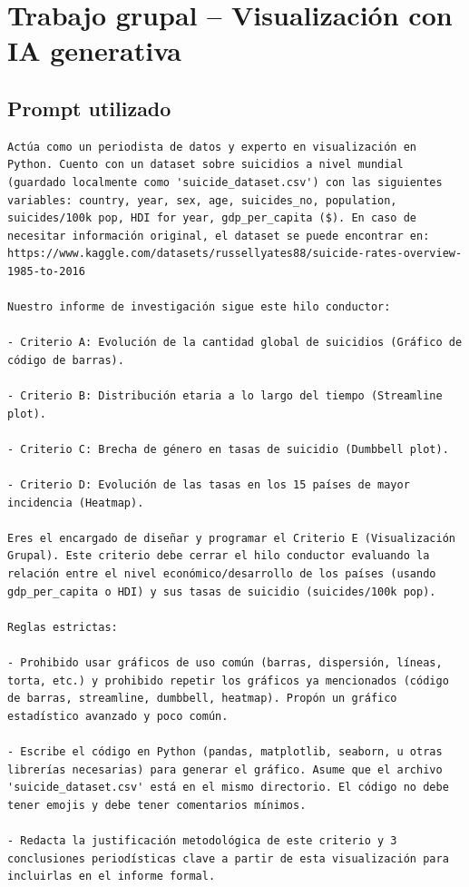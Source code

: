 \documentclass[12pt, letterpaper]{article}
\begin{document}
\section{Trabajo grupal -- Visualización con IA generativa}

\subsection{Prompt utilizado}

\begin{lstlisting}[basicstyle=\small\ttfamily, breaklines=true, frame=single, mathescape=false]
Actúa como un periodista de datos y experto en visualización en Python. Cuento con un dataset sobre suicidios a nivel mundial (guardado localmente como 'suicide_dataset.csv') con las siguientes variables: country, year, sex, age, suicides_no, population, suicides/100k pop, HDI for year, gdp_per_capita ($). En caso de necesitar información original, el dataset se puede encontrar en: https://www.kaggle.com/datasets/russellyates88/suicide-rates-overview-1985-to-2016

Nuestro informe de investigación sigue este hilo conductor:

- Criterio A: Evolución de la cantidad global de suicidios (Gráfico de código de barras).

- Criterio B: Distribución etaria a lo largo del tiempo (Streamline plot).

- Criterio C: Brecha de género en tasas de suicidio (Dumbbell plot).

- Criterio D: Evolución de las tasas en los 15 países de mayor incidencia (Heatmap).

Eres el encargado de diseñar y programar el Criterio E (Visualización Grupal). Este criterio debe cerrar el hilo conductor evaluando la relación entre el nivel económico/desarrollo de los países (usando gdp_per_capita o HDI) y sus tasas de suicidio (suicides/100k pop).

Reglas estrictas:

- Prohibido usar gráficos de uso común (barras, dispersión, líneas, torta, etc.) y prohibido repetir los gráficos ya mencionados (código de barras, streamline, dumbbell, heatmap). Propón un gráfico estadístico avanzado y poco común.

- Escribe el código en Python (pandas, matplotlib, seaborn, u otras librerías necesarias) para generar el gráfico. Asume que el archivo 'suicide_dataset.csv' está en el mismo directorio. El código no debe tener emojis y debe tener comentarios mínimos.

- Redacta la justificación metodológica de este criterio y 3 conclusiones periodísticas clave a partir de esta visualización para incluirlas en el informe formal.
\end{lstlisting}
\end{document}
